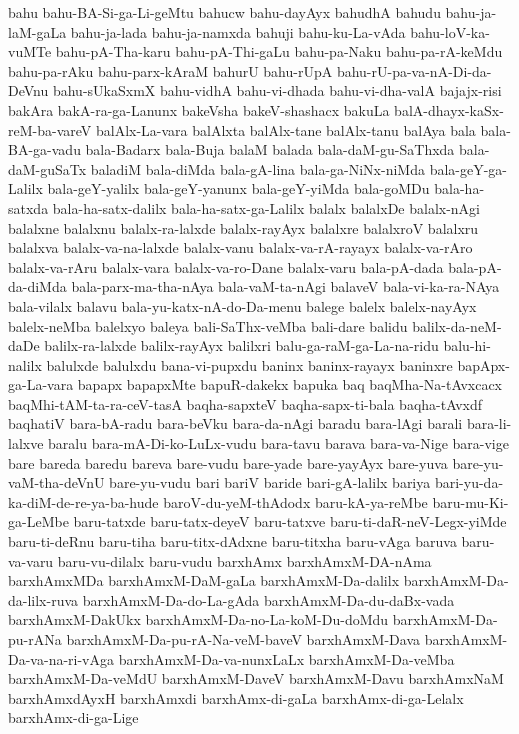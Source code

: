 {bahu
bahu-BA-Si-ga-Li-geMtu
bahucw
bahu-dayAyx
bahudhA
bahudu
bahu-ja-laM-gaLa
bahu-ja-lada
bahu-ja-namxda
bahuji
bahu-ku-La-vAda
bahu-loV-ka-vuMTe
bahu-pA-Tha-karu
bahu-pA-Thi-gaLu
bahu-pa-Naku
bahu-pa-rA-keMdu
bahu-pa-rAku
bahu-parx-kAraM
bahurU
bahu-rUpA
bahu-rU-pa-va-nA-Di-da-DeVnu
bahu-sUkaSxmX
bahu-vidhA
bahu-vi-dhada
bahu-vi-dha-valA
bajajx-risi
bakAra
bakA-ra-ga-Lanunx
bakeVsha
bakeV-shashacx
bakuLa
balA-dhayx-kaSx-reM-ba-vareV
balAlx-La-vara
balAlxta
balAlx-tane
balAlx-tanu
balAya
bala
bala-BA-ga-vadu
bala-Badarx
bala-Buja
balaM
balada
bala-daM-gu-SaThxda
bala-daM-guSaTx
baladiM
bala-diMda
bala-gA-lina
bala-ga-NiNx-niMda
bala-geY-ga-Lalilx
bala-geY-yalilx
bala-geY-yanunx
bala-geY-yiMda
bala-goMDu
bala-ha-satxda
bala-ha-satx-dalilx
bala-ha-satx-ga-Lalilx
balalx
balalxDe
balalx-nAgi
balalxne
balalxnu
balalx-ra-lalxde
balalx-rayAyx
balalxre
balalxroV
balalxru
balalxva
balalx-va-na-lalxde
balalx-vanu
balalx-va-rA-rayayx
balalx-va-rAro
balalx-va-rAru
balalx-vara
balalx-va-ro-Dane
balalx-varu
bala-pA-dada
bala-pA-da-diMda
bala-parx-ma-tha-nAya
bala-vaM-ta-nAgi
balaveV
bala-vi-ka-ra-NAya
bala-vilalx
balavu
bala-yu-katx-nA-do-Da-menu
balege
balelx
balelx-nayAyx
balelx-neMba
balelxyo
baleya
bali-SaThx-veMba
bali-dare
balidu
balilx-da-neM-daDe
balilx-ra-lalxde
balilx-rayAyx
balilxri
balu-ga-raM-ga-La-na-ridu
balu-hi-nalilx
balulxde
balulxdu
bana-vi-pupxdu
baninx
baninx-rayayx
baninxre
bapApx-ga-La-vara
bapapx
bapapxMte
bapuR-dakekx
bapuka
baq
baqMha-Na-tAvxcacx
baqMhi-tAM-ta-ra-ceV-tasA
baqha-sapxteV
baqha-sapx-ti-bala
baqha-tAvxdf
baqhatiV
bara-bA-radu
bara-beVku
bara-da-nAgi
baradu
bara-lAgi
barali
bara-li-lalxve
baralu
bara-mA-Di-ko-LuLx-vudu
bara-tavu
barava
bara-va-Nige
bara-vige
bare
bareda
baredu
bareva
bare-vudu
bare-yade
bare-yayAyx
bare-yuva
bare-yu-vaM-tha-deVnU
bare-yu-vudu
bari
bariV
baride
bari-gA-lalilx
bariya
bari-yu-da-ka-diM-de-re-ya-ba-hude
baroV-du-yeM-thAdodx
baru-kA-ya-reMbe
baru-mu-Ki-ga-LeMbe
baru-tatxde
baru-tatx-deyeV
baru-tatxve
baru-ti-daR-neV-Legx-yiMde
baru-ti-deRnu
baru-tiha
baru-titx-dAdxne
baru-titxha
baru-vAga
baruva
baru-va-varu
baru-vu-dilalx
baru-vudu
barxhAmx
barxhAmxM-DA-nAma
barxhAmxMDa
barxhAmxM-DaM-gaLa
barxhAmxM-Da-dalilx
barxhAmxM-Da-da-lilx-ruva
barxhAmxM-Da-do-La-gAda
barxhAmxM-Da-du-daBx-vada
barxhAmxM-DakUkx
barxhAmxM-Da-no-La-koM-Du-doMdu
barxhAmxM-Da-pu-rANa
barxhAmxM-Da-pu-rA-Na-veM-baveV
barxhAmxM-Dava
barxhAmxM-Da-va-na-ri-vAga
barxhAmxM-Da-va-nunxLaLx
barxhAmxM-Da-veMba
barxhAmxM-Da-veMdU
barxhAmxM-DaveV
barxhAmxM-Davu
barxhAmxNaM
barxhAmxdAyxH
barxhAmxdi
barxhAmx-di-gaLa
barxhAmx-di-ga-Lelalx
barxhAmx-di-ga-Lige
}
